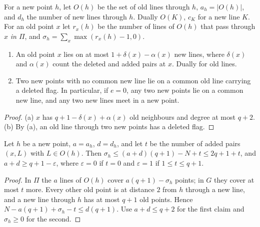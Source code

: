 For a new point $h$, let $O(h)$ be the set of old lines through $h$, $a_h = |O(h)|$, and $d_h$ the number of new lines
through $h$. Dually $O(K)$, $c_K$ for a new line $K$. For an old point $x$ let $r_x(h)$ be the number of lines of
$O(h)$ that pass through $x$ \emph{in $\Pi$}, and $\sigma_h = \sum_x \max(r_x(h)-1, 0)$.

\begin{lemma}\label{lem:budget}
\begin{enumerate}[label=\textup{(\alph*)}]
\item An old point $x$ lies on at most $1 + \delta(x) - \alpha(x)$ new lines, where $\delta(x)$ and $\alpha(x)$ count
the deleted and added pairs at $x$. Dually for old lines.
\item Two new points with no common new line lie on a common old line carrying a deleted flag.
In particular, if $e = 0$, any two new points lie on a common new line, and any two new lines meet in a new point.
\end{enumerate}
\end{lemma}
\begin{proof}
(a) $x$ has $q+1-\delta(x)+\alpha(x)$ old neighbours and degree at most $q+2$.
(b) By (a), an old line through two new points has a deleted flag.
\end{proof}

\begin{lemma}\label{lem:cover}
Let $h$ be a new point, $a = a_h$, $d = d_h$, and let $t$ be the number of added pairs $(x,L)$ with $L \in O(h)$.
Then $\sigma_h \le (a+d)(q+1) - N + t \le 2q+1+t$, and $a+d \ge q+1-\varepsilon$, where $\varepsilon = 0$ if $t = 0$ and
$\varepsilon = 1$ if $1 \le t \le q+1$.
\end{lemma}
\begin{proof}
In $\Pi$ the $a$ lines of $O(h)$ cover $a(q+1)-\sigma_h$ points; in $G$ they cover at most $t$ more.
Every other old point is at distance $2$ from $h$ through a new line, and a new line through $h$ has at most $q+1$ old
points. Hence $N - a(q+1) + \sigma_h - t \le d(q+1)$. Use $a + d \le q+2$ for the first claim and $\sigma_h \ge 0$ for the second.
\end{proof}


